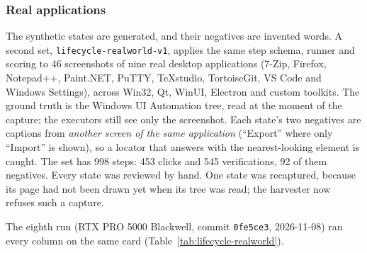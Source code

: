 \documentclass[11pt,a4paper]{article}
\newcommand{\code}[1]{\texttt{#1}}
\begin{document}
\subsubsection{Real applications}
\label{sec:lifecycle-realworld}
The synthetic states are generated, and their negatives are invented words. A second
set, \code{lifecycle-realworld-v1}, applies the same step schema, runner and scoring to
46 screenshots of nine real desktop applications (7-Zip, Firefox, Notepad++,
Paint.NET, PuTTY, TeXstudio, TortoiseGit, VS Code and Windows Settings), across
Win32, Qt, WinUI, Electron and custom toolkits. The ground truth is the Windows UI
Automation tree, read at the moment of the capture; the executors still see only the
screenshot. Each state's two negatives are captions from \emph{another screen of the
same application} (``Export'' where only ``Import'' is shown), so a locator that
answers with the nearest-looking element is caught. The set has 998 steps: 453 clicks
and 545 verifications, 92 of them negatives. Every state was reviewed by hand. One
state was recaptured, because its page had not been drawn yet when its tree was
read; the harvester now refuses such a capture.

The eighth run (RTX PRO 5000 Blackwell, commit \code{0fe5ce3}, 2026-11-08) ran every
column on the same card (Table~\ref{tab:lifecycle-realworld}).
\end{document}
